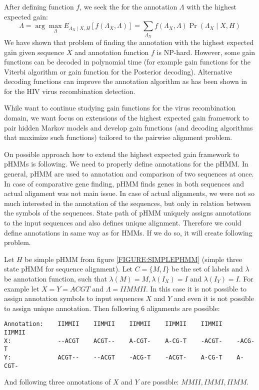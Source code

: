 After defining function $f$, we seek the for the annotation $\Lambda$ with the highest expected gain:
\[\Lambda = \arg\max_{\Lambda} 
E_{\Lambda_X\mid X,H}[f(\Lambda_X,\Lambda)] =
\sum_{\Lambda_X}f(\Lambda_X,\Lambda)\Pr\left(\Lambda_X\mid X,H\right)
\]
We have shown that problem of finding the annotation with the highest expected
gain given sequence $X$ and annotation function $f$ is NP-hard. However, some
gain functions can be decoded in polynomial time (for example gain functions for
the Viterbi algorithm or gain function for  the Posterior decoding). Alternative
decoding functions can improve the annotation algorithm as has been shown in
\cite{Nanasi2010,Truszkowski2011} for the HIV virus recombination detection.

While want to continue studying gain functions for the virus recombination
domain, we want focus on extensions of the highest expected gain framework to
pair hidden Markov models and develop gain functions (and decoding algorithms
that maximize such functions) tailored to the pairwise alignment problem. 

On possible approach how to extend the highest expected gain framework to pHMMs
is following.  We need to properly define annotations for the pHMM. In general,
pHMM are used to annotation and comparison of two sequences at once. In case of
comparative gene finding, pHMM finds genes in both sequences and actual
alignment was not main issue. In case of actual alignments, we were not so much
interested in the annotation of the sequences, but only in relation between the
symbols of the sequences. State path of pHMM uniquely assigns annotations to the
input sequences and also defines unique alignment.  Therefore we could define
annotations in same way as for HMMs. If we do so, it will create following
problem.

Let $H$ be simple pHMM from figure \ref{FIGURE:SIMPLEPHMM} (simple three state
pHMM for sequence alignment). Let $C=\{M,I\}$ be the set of labels and 
$\lambda$ be annotation function, such that $\lambda(M)=M, \lambda(I_X)=I$ and
$\lambda(I_Y)=I$.   For example let $X=Y=ACGT$ and $\Lambda = IIMMII$.
In this case it is not possible to assign annotation symbols
to input sequences $X$ and $Y$ and even it is not possible to assign unique
annotation.
Then
following $6$ alignments are possible:
\begin{verbatim}
Annotation:    IIMMII    IIMMII    IIMMII    IIMMII    IIMMII    IIMMII
X:             --ACGT    ACGT--    A-CGT-    A-CG-T    -ACGT-    -ACG-T
Y:             ACGT--    --ACGT    -ACG-T    -ACGT-    A-CG-T    A-CGT-
\end{verbatim}
And following three annotations of $X$ and $Y$ are possible: $MMII,IMMI,IIMM$.

